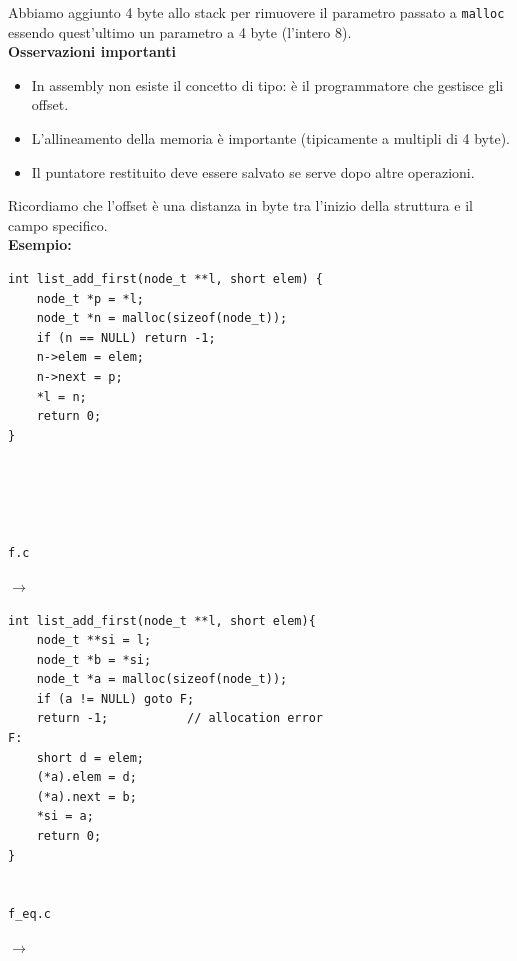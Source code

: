\noindent  Abbiamo aggiunto 4 byte allo stack per rimuovere il parametro passato a \texttt{malloc} essendo
quest'ultimo un parametro a 4 byte (l'intero 8).\\
\noindent\textbf{Osservazioni importanti}
\begin{itemize}
    \item In assembly non esiste il concetto di tipo: è il programmatore che gestisce gli offset.
    \item L'allineamento della memoria è importante (tipicamente a multipli di 4 byte).
    \item Il puntatore restituito deve essere salvato se serve dopo altre operazioni.
\end{itemize}
\noindent Ricordiamo che l'offset è una distanza in byte tra 
l'inizio della struttura e il campo specifico. \bigskip\\
\newpage
\noindent\textbf{Esempio:} \bigskip\\
\begin{minipage}{0.3\textwidth}
    \begin{verbatim}
int list_add_first(node_t **l, short elem) {
    node_t *p = *l;
    node_t *n = malloc(sizeof(node_t));
    if (n == NULL) return -1;         
    n->elem = elem;
    n->next = p;
    *l = n;
    return 0;
}





f.c
    \end{verbatim}
\end{minipage}
\hfill
$\longrightarrow$
\hfill
\begin{minipage}{0.3\textwidth}
    \begin{verbatim}
int list_add_first(node_t **l, short elem){
    node_t **si = l;
    node_t *b = *si;
    node_t *a = malloc(sizeof(node_t));
    if (a != NULL) goto F;
    return -1;           // allocation error
F:
    short d = elem;
    (*a).elem = d;
    (*a).next = b;
    *si = a;
    return 0;
}


f_eq.c
    \end{verbatim}
\end{minipage}
\hfill
$\longrightarrow$
\hfill
